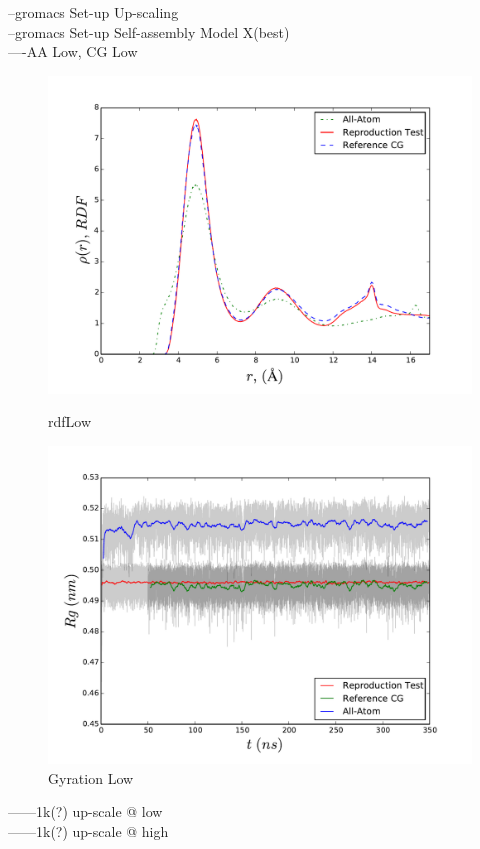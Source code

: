 \documentclass[10pt,a4paper,twoside]{article}
\begin{document}
 --gromacs Set-up Up-scaling \\
 --gromacs Set-up Self-assembly Model X(best)\\
  ----AA Low, CG Low\\
   \begin{figure}[ht!]
  \begin{center}
	\includegraphics[width=1 \textwidth]{./graphs/rdfL}
	\caption{rdfLow}
		\includegraphics[width=1 \textwidth]{./graphs/GyraL}
	\caption{Gyration Low}
	\label{gfx:rdfLow}
	\end{center}
	\end{figure}
   ------1k(?) up-scale @ low\\
   ------1k(?) up-scale @ high\\
\end{document}
